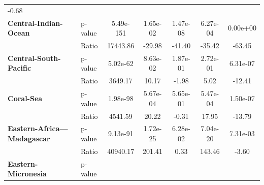 \begin{table}[H]
{\begin{tabular}{llccccc}
            -0.68
            \\
            \textbf{Central-Indian-Ocean}                       & p-value  &
            5.49e-151                                           & 1.65e-02 &
            1.47e-08                                            & 6.27e-04 &
            0.00e+00
            \\
            \textbf{}                                           & Ratio    &
            17443.86                                            & -29.98   &
            -41.40
                                                                & -35.42   &
            -63.45
            \\
            \textbf{Central-South-Pacific}                      & p-value  &
            5.02e-62                                            & 8.63e-02 &
            1.87e-01                                            & 2.72e-01 &
            6.31e-07
            \\
            \textbf{}                                           & Ratio    &
            3649.17                                             & 10.17    &
            -1.98
                                                                & 5.02     &
            -12.41
            \\
            \textbf{Coral-Sea}                                  & p-value  &
            1.98e-98                                            & 5.67e-04 &
            5.65e-01                                            & 5.47e-04 &
            1.50e-07
            \\
            \textbf{}                                           & Ratio    &
            4541.59                                             & 20.22    &
            -0.31
                                                                & 17.95    &
            -13.79
            \\
            \textbf{Eastern-Africa---Madagascar}                & p-value  &
            9.13e-91                                            & 1.72e-25 &
            6.28e-02                                            & 7.04e-20 &
            7.31e-03
            \\
            \textbf{}                                           & Ratio    &
            40940.17                                            & 201.41   &
            0.33
                                                                & 143.46   &
            -3.60
            \\
            \textbf{Eastern-Micronesia}                         & p-value  &

\end{tabular}}
\end{table}
